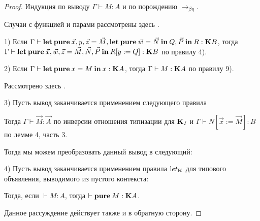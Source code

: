 \begin{proof}

Индукция по выводу $\Gamma \vdash M : A$ и по порождению $\rightarrow_{\beta \eta}$.

Случаи с функцией и парами рассмотрены здесь \cite{Morten} \cite{Pierce}.

1) Если $\Gamma \vdash {\bf let \: pure \:} \vec{x}, y, \vec{z} = \vec{M}, {\bf let \: pure \: } \vec{w} = \vec{N} {\bf \: in \: } Q, \vec{P}  {\: \bf in \:} R : {\bf K}B$,
тогда $\Gamma \vdash {\bf let \: pure \:} \vec{x}, \vec{w}, \vec{z} = \vec{M}, \vec{N}, \vec{P} \: { \bf in } \: R [y := Q] : {\bf K}B$ по правилу 4).

2) Если $\Gamma \vdash {\bf let \: pure \:} x = M {\: \bf in \: } x : {\bf K}A$, тогда $\Gamma \vdash M : {\bf K}A$ по правилу 9).

Рассмотрено здесь \cite{ModalK}.

3) Пусть вывод заканчивается применением следующего правила

\begin{prooftree}
\end{prooftree}

Тогда $\Gamma \vdash \vec{M} : \vec{A}$ по инверсии отношения типизации для ${\bf K}_I$ и $\Gamma \vdash N [\vec{x} := \vec{M}] : B$ по лемме 4, часть 3.

Тогда мы можем преобразовать данный вывод в следующий:

\begin{prooftree}
\end{prooftree}

4) Пусть вывод заканчивается применением правила ${\text let}_{\bf K}$ для типового объявления, выводимого из пустого контекста:

\begin{prooftree}
\end{prooftree}

Тогда, если $\vdash M : A$, тогда $\vdash {\bf pure \:} M : {\bf K}A$.

Данное рассуждение действует также и в обратную сторону.
\end{proof}


